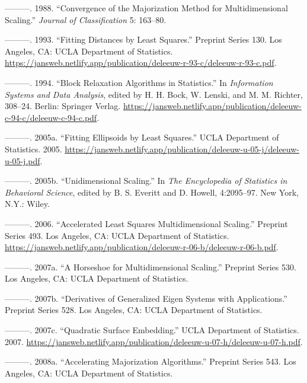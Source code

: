 \documentclass[
  12pt,
  letterpaper,
  DIV=11,
  numbers=noendperiod]{scrreprt}
\newlength{\cslhangindent}
\newenvironment{CSLReferences}[2] %
 {\begin{list}{}{%
  \setlength{\itemindent}{0pt}
  \setlength{\leftmargin}{0pt}
  \setlength{\parsep}{0pt}
  \ifodd #1
   \setlength{\leftmargin}{\cslhangindent}
   \setlength{\itemindent}{-1\cslhangindent}
  \fi
  \setlength{\itemsep}{#2\baselineskip}}}
 {\end{list}}
\theoremstyle{remark}
\begin{document}
\begin{CSLReferences}{1}{0}
---------. 1988. {``Convergence of the Majorization Method for
Multidimensional Scaling.''} \emph{Journal of Classification} 5:
163--80.

---------. 1993. {``Fitting Distances by Least Squares.''} Preprint
Series 130. Los Angeles, CA: UCLA Department of Statistics.
\url{https://jansweb.netlify.app/publication/deleeuw-r-93-c/deleeuw-r-93-c.pdf}.

---------. 1994. {``{Block Relaxation Algorithms in Statistics}.''} In
\emph{Information Systems and Data Analysis}, edited by H. H. Bock, W.
Lenski, and M. M. Richter, 308--24. Berlin: Springer Verlag.
\url{https://jansweb.netlify.app/publication/deleeuw-c-94-c/deleeuw-c-94-c.pdf}.

---------. 2005a. {``{Fitting Ellipsoids by Least Squares}.''} UCLA
Department of Statistics. 2005.
\url{https://jansweb.netlify.app/publication/deleeuw-u-05-j/deleeuw-u-05-j.pdf}.

---------. 2005b. {``{Unidimensional Scaling}.''} In \emph{The
Encyclopedia of Statistics in Behavioral Science}, edited by B. S.
Everitt and D. Howell, 4:2095--97. New York, N.Y.: Wiley.

---------. 2006. {``{Accelerated Least Squares Multidimensional
Scaling}.''} Preprint Series 493. Los Angeles, CA: UCLA Department of
Statistics.
\url{https://jansweb.netlify.app/publication/deleeuw-r-06-b/deleeuw-r-06-b.pdf}.

---------. 2007a. {``{A Horseshoe for Multidimensional Scaling}.''}
Preprint Series 530. Los Angeles, CA: UCLA Department of Statistics.

---------. 2007b. {``Derivatives of Generalized Eigen Systems with
Applications.''} Preprint Series 528. Los Angeles, CA: UCLA Department
of Statistics.

---------. 2007c. {``{Quadratic Surface Embedding}.''} UCLA Department
of Statistics. 2007.
\url{https://jansweb.netlify.app/publication/deleeuw-u-07-h/deleeuw-u-07-h.pdf}.

---------. 2008a. {``Accelerating Majorization Algorithms.''} Preprint
Series 543. Los Angeles, CA: UCLA Department of Statistics.


\end{CSLReferences}
\end{document}
